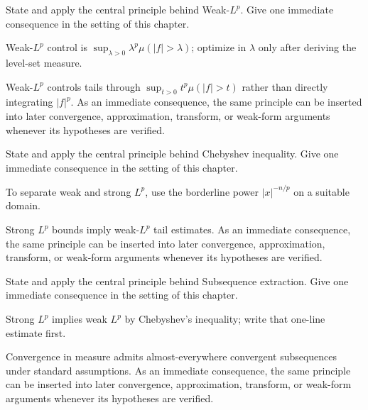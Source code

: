\begin{exercise}\label{exr:iii08-05}
State and apply the central principle behind Weak-$L^p$. Give one immediate consequence in the setting of this chapter.
\end{exercise}
\begin{hint}
Weak-\(L^p\) control is \(\sup_{\lambda>0}\lambda^p\mu(|f|>\lambda)\); optimize in \(\lambda\) only after deriving the level-set measure.
\end{hint}
\begin{solution}
Weak-$L^p$ controls tails through $\sup_{t>0}t^p\mu(|f|>t)$ rather than directly integrating $|f|^p$. As an immediate consequence, the same principle can be inserted into later convergence, approximation, transform, or weak-form arguments whenever its hypotheses are verified.
\end{solution}

\begin{exercise}\label{exr:iii08-06}
State and apply the central principle behind Chebyshev inequality. Give one immediate consequence in the setting of this chapter.
\end{exercise}
\begin{hint}
To separate weak and strong \(L^p\), use the borderline power \(|x|^{-n/p}\) on a suitable domain.
\end{hint}
\begin{solution}
Strong $L^p$ bounds imply weak-$L^p$ tail estimates. As an immediate consequence, the same principle can be inserted into later convergence, approximation, transform, or weak-form arguments whenever its hypotheses are verified.
\end{solution}

\begin{exercise}\label{exr:iii08-07}
State and apply the central principle behind Subsequence extraction. Give one immediate consequence in the setting of this chapter.
\end{exercise}
\begin{hint}
Strong \(L^p\) implies weak \(L^p\) by Chebyshev's inequality; write that one-line estimate first.
\end{hint}
\begin{solution}
Convergence in measure admits almost-everywhere convergent subsequences under standard assumptions. As an immediate consequence, the same principle can be inserted into later convergence, approximation, transform, or weak-form arguments whenever its hypotheses are verified.
\end{solution}

